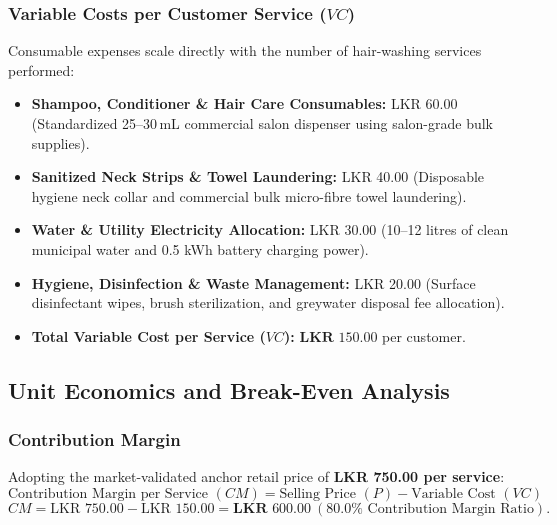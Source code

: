 \subsubsection{Variable Costs per Customer Service ($VC$)}
Consumable expenses scale directly with the number of hair-washing services performed:
\begin{itemize}[leftmargin=1.5em, itemsep=0.15em]
    \item \textbf{Shampoo, Conditioner \& Hair Care Consumables:} LKR 60.00 (Standardized 25--30\,mL commercial salon dispenser using salon-grade bulk supplies).
    \item \textbf{Sanitized Neck Strips \& Towel Laundering:} LKR 40.00 (Disposable hygiene neck collar and commercial bulk micro-fibre towel laundering).
    \item \textbf{Water \& Utility Electricity Allocation:} LKR 30.00 (10--12 litres of clean municipal water and 0.5 kWh battery charging power).
    \item \textbf{Hygiene, Disinfection \& Waste Management:} LKR 20.00 (Surface disinfectant wipes, brush sterilization, and greywater disposal fee allocation).
    \item \textbf{Total Variable Cost per Service ($VC$):} $\mathbf{\text{LKR } 150.00}$ per customer.
\end{itemize}

\subsection{Unit Economics and Break-Even Analysis}
\label{subsec:unit_economics_breakeven}

\subsubsection{Contribution Margin}
Adopting the market-validated anchor retail price of \textbf{LKR 750.00 per service}:
\begin{equation}
    \text{Contribution Margin per Service } (CM) = \text{Selling Price } (P) - \text{Variable Cost } (VC)
\end{equation}
\begin{equation}
    CM = \text{LKR } 750.00 - \text{LKR } 150.00 = \mathbf{\text{LKR } 600.00} \ (\mathbf{80.0\%} \text{ Contribution Margin Ratio}).
\end{equation}

